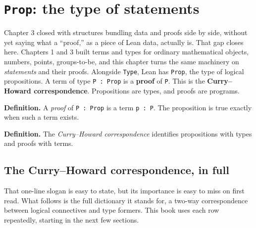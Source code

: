\section{\texorpdfstring{\texttt{Prop}: the type of statements}{Prop: the type of statements}}\label{sec:04-propositions-and-proofs:01-prop:1}

Chapter 3 closed with structures bundling data and proofs side by side, without yet saying what a ``proof,'' as a piece of Lean data, actually is. That gap closes here. Chapters 1 and 3 built terms and types for ordinary mathematical objects, numbers, points, groups-to-be, and this chapter turns the same machinery on \emph{statements} and their proofs. Alongside \texttt{Type}, Lean has \texttt{Prop}, the type of logical propositions. A term of type \texttt{P : Prop} is a \textbf{proof} of \texttt{P}. This is the \textbf{Curry--Howard correspondence}. Propositions are types, and proofs are programs.

\textbf{Definition.} A \emph{proof} of \texttt{P : Prop} is a term \texttt{p : P}. The proposition is true exactly when such a term exists.

\textbf{Definition.} The \emph{Curry--Howard correspondence} identifies propositions with types and proofs with terms.

\subsection{The Curry--Howard correspondence, in full}\label{sec:04-propositions-and-proofs:01-prop:2}

That one-line slogan is easy to state, but its importance is easy to miss on first read. What follows is the full dictionary it stands for, a two-way correspondence between logical connectives and type formers. This book uses each row repeatedly, starting in the next few sections.

